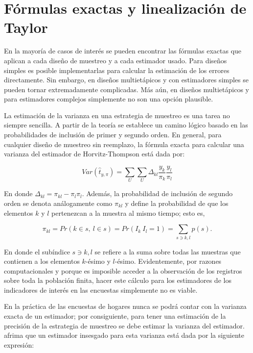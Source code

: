 \documentclass[
  12pt,
]{book}
\begin{document}
\hypertarget{fuxf3rmulas-exactas-y-linealizaciuxf3n-de-taylor}{%
\section{Fórmulas exactas y linealización de Taylor}\label{fuxf3rmulas-exactas-y-linealizaciuxf3n-de-taylor}}

En la mayoría de casos de interés se pueden encontrar las fórmulas exactas que aplican a cada diseño de muestreo y a cada estimador usado. Para diseños simples es posible implementarlas para calcular la estimación de los errores directamente. Sin embargo, en diseños multietápicos y con estimadores simples se pueden tornar extremadamente complicadas. Más aún, en diseños multietápicos y para estimadores complejos simplemente no son una opción plausible.

La estimación de la varianza en una estrategia de muestreo es una tarea no siempre sencilla. A partir de la teoría se establece un camino lógico basado en las probabilidades de inclusión de primer y segundo orden. En general, para cualquier diseño de muestreo sin reemplazo, la fórmula exacta para calcular una varianza del estimador de Horvitz-Thompson está dada por:

\[Var(\hat{t}_{y,\pi}) = \sum_U\sum_U \Delta_{kl}\frac{y_k}{\pi_k}\frac{y_l}{\pi_l}\]

En donde \(\Delta_{kl} = \pi_{kl} - \pi_l \pi_l\). Además, la probabilidad de inclusión de segundo orden se denota análogamente como \(\pi_{kl}\) y define la probabilidad de que los elementos \(k\) y \(l\) pertenezcan a la muestra al mismo tiempo; esto es,

\[
\pi_{kl}=Pr(k\in s, \  l\in s)=Pr(I_k\ I_l=1)=\sum_{s \ni k, l} p(s).
\]

En donde el subíndice \({s \ni k, l}\) se refiere a la suma sobre todas las muestras que contienen a los elementos \(k\)-ésimo y \(l\)-ésimo. Evidentemente, por razones computacionales y porque es imposible acceder a la observación de los registros sobre toda la población finita, hacer este cálculo para los estimadores de los indicadores de interés en las encuestas simplemente no es viable.

En la práctica de las encuestas de hogares nunca se podrá contar con la varianza exacta de un estimador; por consiguiente, para tener una estimación de la precisión de la estrategia de muestreo se debe estimar la varianza del estimador. \citet{Gutierrez_2016} afrima que un estimador insesgado para esta varianza está dada por la siguiente expresión:
\end{document}

